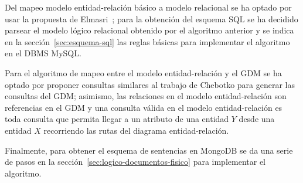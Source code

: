 Del mapeo modelo entidad-relación básico a modelo relacional se ha optado por usar la propuesta de Elmasri~\cite{ramez_elmasri_fundamentos_nodate}; para la obtención del esquema SQL se ha decidido parsear el modelo lógico relacional obtenido por el algoritmo anterior y se indica en la sección~\ref{sec:esquema-sql} las reglas básicas para implementar el algoritmo en el DBMS MySQL.


Para el algoritmo de mapeo entre el modelo entidad-relación y el GDM se ha optado por proponer consultas similares al trabajo de Chebotko\cite{chebotko_big_2015} para generar las consultas del GDM; asimismo, las relaciones en el modelo entidad-relación son referencias en el GDM y una consulta válida en el modelo entidad-relación es toda consulta que permita llegar a un atributo de una entidad $Y$ desde una entidad $X$ recorriendo las rutas del diagrama entidad-relación.


Finalmente, para obtener el esquema de sentencias en MongoDB se da una serie de pasos en la sección~\ref{sec:logico-documentos-fisico} para implementar el algoritmo.